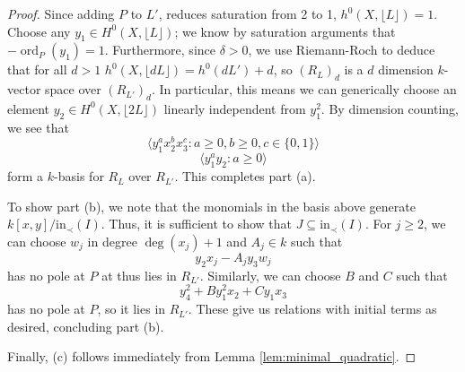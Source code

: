 \documentclass{amsart}
\theoremstyle{plain}
\theoremstyle{definition}
\theoremstyle{remark}
\numberwithin{equation}{section}
\DeclareMathOperator{\ord}{ord}
\newcommand \halfcan{L}
\newcommand \initial{\text{in}}
\begin{document}
\begin{proof}
Since adding $P$ to $L'$, reduces saturation from 2 to 1, $h^0(X, \lfloor L \rfloor)=1$.  
Choose any $y_1\in H^0(X,\lfloor L\rfloor)$; we know by saturation arguments that $-
\ord_P(y_1)=1$.  Furthermore, since $\delta>0$, we use Riemann-Roch to deduce that for 
all $d>1$ $h^0(X,\lfloor dL\rfloor)=h^0(dL')+d$, so $(R_\halfcan)_d$ is a $d$ dimension $k
$-vector space over $(R_{\halfcan'})_d$.  In particular, this means we can generically 
choose an element $y_2\in H^0(X,\lfloor 2L\rfloor)$ linearly independent from $y_1^2$.  By 
dimension counting, we see that 
\[
	\langle y_1^a x_2^b x_3^c: a\ge 0, b\ge 0, c\in \{0,1\}\rangle
\]
\[
	\langle y_1^a y_2: a\ge 0\rangle
\]
form a $k$-basis for $R_\halfcan$ over $R_{\halfcan'}$.  This completes part (a).

To show part (b), we note that the monomials in the basis above generate $k[x,y]/\initial_
\prec(I)$.  Thus, it is sufficient to show that $J\subseteq \initial_\prec(I)$.  For $j\ge 2$, we 
can choose $w_j$ in degree $\deg(x_j)+1$ and $A_j\in k$ such that
\[
	y_2x_j-A_jy_3w_j
\]
has no pole at $P$ at thus lies in $R_{\halfcan'}$.  Similarly, we can choose $B$ and $C$ 
such that
\[y^2_4+By_1^2x_2+Cy_1x_3\]
has no pole at $P$, so it lies in $R_{\halfcan'}$.  These give us relations with initial terms 
as desired, concluding part (b).

Finally, (c) follows immediately from Lemma \ref{lem:minimal_quadratic}.

\end{proof}
\end{document}
